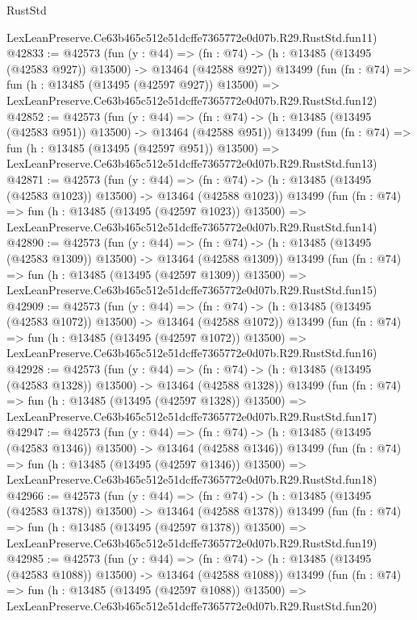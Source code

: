 \begin{lexlean}{RustStd}
\begin{coremodule}
    LexLeanPreserve.Ce63b465c512e51dcffe7365772e0d07b.R29.RustStd.fun11)
@42833 := @42573
    (fun (y : @44) =>
    (fn : @74) -> (h : @13485 (@13495 (@42583 @927)) @13500) -> @13464 (@42588 @927))
    @13499
    (fun (fn : @74) =>
    fun (h : @13485 (@13495 (@42597 @927)) @13500) =>
    LexLeanPreserve.Ce63b465c512e51dcffe7365772e0d07b.R29.RustStd.fun12)
@42852 := @42573
    (fun (y : @44) =>
    (fn : @74) -> (h : @13485 (@13495 (@42583 @951)) @13500) -> @13464 (@42588 @951))
    @13499
    (fun (fn : @74) =>
    fun (h : @13485 (@13495 (@42597 @951)) @13500) =>
    LexLeanPreserve.Ce63b465c512e51dcffe7365772e0d07b.R29.RustStd.fun13)
@42871 := @42573
    (fun (y : @44) =>
    (fn : @74) -> (h : @13485 (@13495 (@42583 @1023)) @13500) -> @13464 (@42588 @1023))
    @13499
    (fun (fn : @74) =>
    fun (h : @13485 (@13495 (@42597 @1023)) @13500) =>
    LexLeanPreserve.Ce63b465c512e51dcffe7365772e0d07b.R29.RustStd.fun14)
@42890 := @42573
    (fun (y : @44) =>
    (fn : @74) -> (h : @13485 (@13495 (@42583 @1309)) @13500) -> @13464 (@42588 @1309))
    @13499
    (fun (fn : @74) =>
    fun (h : @13485 (@13495 (@42597 @1309)) @13500) =>
    LexLeanPreserve.Ce63b465c512e51dcffe7365772e0d07b.R29.RustStd.fun15)
@42909 := @42573
    (fun (y : @44) =>
    (fn : @74) -> (h : @13485 (@13495 (@42583 @1072)) @13500) -> @13464 (@42588 @1072))
    @13499
    (fun (fn : @74) =>
    fun (h : @13485 (@13495 (@42597 @1072)) @13500) =>
    LexLeanPreserve.Ce63b465c512e51dcffe7365772e0d07b.R29.RustStd.fun16)
@42928 := @42573
    (fun (y : @44) =>
    (fn : @74) -> (h : @13485 (@13495 (@42583 @1328)) @13500) -> @13464 (@42588 @1328))
    @13499
    (fun (fn : @74) =>
    fun (h : @13485 (@13495 (@42597 @1328)) @13500) =>
    LexLeanPreserve.Ce63b465c512e51dcffe7365772e0d07b.R29.RustStd.fun17)
@42947 := @42573
    (fun (y : @44) =>
    (fn : @74) -> (h : @13485 (@13495 (@42583 @1346)) @13500) -> @13464 (@42588 @1346))
    @13499
    (fun (fn : @74) =>
    fun (h : @13485 (@13495 (@42597 @1346)) @13500) =>
    LexLeanPreserve.Ce63b465c512e51dcffe7365772e0d07b.R29.RustStd.fun18)
@42966 := @42573
    (fun (y : @44) =>
    (fn : @74) -> (h : @13485 (@13495 (@42583 @1378)) @13500) -> @13464 (@42588 @1378))
    @13499
    (fun (fn : @74) =>
    fun (h : @13485 (@13495 (@42597 @1378)) @13500) =>
    LexLeanPreserve.Ce63b465c512e51dcffe7365772e0d07b.R29.RustStd.fun19)
@42985 := @42573
    (fun (y : @44) =>
    (fn : @74) -> (h : @13485 (@13495 (@42583 @1088)) @13500) -> @13464 (@42588 @1088))
    @13499
    (fun (fn : @74) =>
    fun (h : @13485 (@13495 (@42597 @1088)) @13500) =>
    LexLeanPreserve.Ce63b465c512e51dcffe7365772e0d07b.R29.RustStd.fun20)

\end{coremodule}
\end{lexlean}
